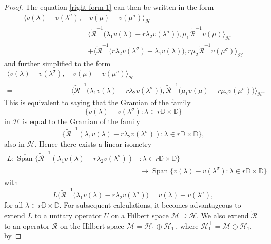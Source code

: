 \documentclass[12pt,reqno]{amsart}
\numberwithin{equation}{section}
\DeclareMathOperator{\spn}{Span}
\theoremstyle{definition}
\begin{document}
\begin{proof}
The equation \eqref{right-form-1} can then be written in the form
\begin{align*}
\Big\langle v(\lambda) - v(\lambda^{\sigma}),& \ v(\mu)-v(\mu^{\sigma})\Big\rangle_{\mathcal{H}} \\
=&\Big\langle \widetilde{\mathcal{R}}^{-1}\big(\lambda_{1} v(\lambda)-r\lambda_{2}v(\lambda^{\sigma})\big), \mu_{1}\widetilde{\mathcal{R}}^{-1}v(\mu)\Big\rangle_{\mathcal{H}} \\
&+\Big\langle \widetilde{\mathcal{R}}^{-1}\big(r\lambda_{2}v(\lambda^{\sigma}) - \lambda_{1}v(\lambda)\big),r\mu_{2}\widetilde{\mathcal{R}}^{-1}v(\mu^{\sigma}) \Big\rangle_{\mathcal{H}} 
\end{align*}
and further simplified to the form
\begin{align*}
\Big\langle v(\lambda) - v(\lambda^{\sigma}), & \ v(\mu)-v(\mu^{\sigma})\Big\rangle_{\mathcal{H}} \\
=&\Big\langle \widetilde{\mathcal{R}}^{-1}\big(\lambda_{1} v(\lambda)-r\lambda_{2}v(\lambda^{\sigma})\big), \widetilde{\mathcal{R}}^{-1}\big(\mu_{1}v(\mu)-r\mu_{2}v(\mu^{\sigma})\big)\Big\rangle_{\mathcal{H}}.
\end{align*}
This is equivalent to saying that the Gramian of the family 
$$\{v({\lambda})-v({\lambda}^{\sigma}):\lambda\in r\mathbb{D}\times\mathbb{D}\}$$ in $\mathcal{H}$ is equal to the Gramian of the family 
$$\{\widetilde{\mathcal{R}}^{-1}(\lambda_{1}v({\lambda})-r\lambda_{2}v({\lambda}^{\sigma})) : \lambda \in r\mathbb{D}\times\mathbb{D}\},$$ also in $\mathcal{H}$. Hence
there exists a linear isometry 
\begin{align*}
 L :  \overline{\spn}\Big\{\widetilde{\mathcal{R}}^{-1}(\lambda_{1}v({\lambda})- r\lambda_{2}v({\lambda}^{\sigma})) & : \lambda \in r\mathbb{D}\times\mathbb{D}\Big\} \\
& \rightarrow \overline{\spn}\Big\{v({\lambda})-v({\lambda}^{\sigma}) : \lambda\in r\mathbb{D}\times\mathbb{D}\Big\}
\end{align*}
with
\begin{equation}\label{isometryonthegramian}
L\Big( \widetilde{\mathcal{R}}^{-1}(\lambda_{1}v({\lambda})-r\lambda_{2}v({\lambda}^{\sigma})\Big) = v({\lambda})-v({\lambda}^{\sigma}),
\end{equation}
for all $\lambda \in r\mathbb{D}\times \mathbb{D}$. For subsequent calculations, it becomes advantageous to extend $L$ to a unitary operator $U$ on a Hilbert space $\mathcal{M}\supseteq \mathcal{H}$. We also extend $\widetilde{\mathcal{R}}$ to an operator $\mathcal{R}$ on the Hilbert space $\mathcal{M}=\mathcal{H}_{1}\oplus \mathcal{H}_{1}^{\perp}$, where $\mathcal{H}_{1}^{\perp}= \mathcal{M} \ominus \mathcal{H}_{1}$,  by

\end{proof}
\end{document}
